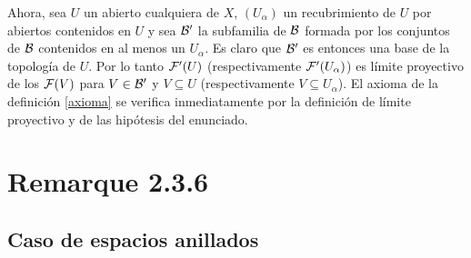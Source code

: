 \documentclass[twoside]{article}
\begin{document}
\begin{dem}
Ahora, sea $U$ un abierto cualquiera de $X$, $(U_\alpha)$ un recubrimiento de $U$ por abiertos contenidos en $U$ y sea ${\mathcal B}'$ la subfamilia de ${\mathcal B}$ formada por los conjuntos de ${\mathcal B}$ contenidos en al menos un $U_\alpha$. Es claro que ${\mathcal B}'$ es entonces una base de la topología de $U$. Por lo tanto $\mathcal{F}'(U)$ (respectivamente $\mathcal{F}'(U_\alpha)$) es límite proyectivo de los $\mathcal{F}(V)$ para $V\in{\mathcal B}'$ y $V\subseteq U$ (respectivamente $V\subseteq U_\alpha$). El axioma de la definición \ref{axioma} se verifica inmediatamente por la definición de límite proyectivo y de las hipótesis del enunciado. 


 \end{dem}
 
 




\section{Remarque 2.3.6}


 \subsection{Caso de espacios anillados}
\end{document}

